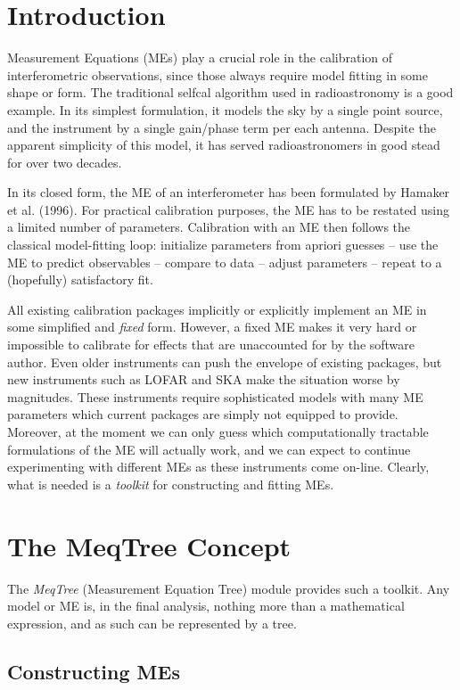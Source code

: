 \documentclass[11pt,twoside]{article}  %
\begin{document}
\section{Introduction}

Measurement Equations (MEs) play a crucial role in the calibration of
interferometric observations, since those always require model fitting in some
shape or form. The traditional selfcal algorithm used in radioastronomy is a
good example. In its simplest formulation, it models the sky by a single point
source, and the instrument by a single gain/phase term per each antenna. Despite
the apparent simplicity of this model, it has served radioastronomers in good
stead for over two decades.

In its closed form, the ME of an interferometer has been formulated by Hamaker
et al. (1996). For practical calibration purposes, the ME has to be restated
using a limited number of parameters. Calibration with an ME then follows the
classical model-fitting loop: initialize parameters from apriori guesses -- use
the ME to predict observables -- compare to data -- adjust parameters -- repeat
to a (hopefully) satisfactory fit.

All existing calibration packages implicitly or explicitly implement an ME in
some simplified and {\em fixed} form. However, a fixed ME makes it very hard or
impossible to calibrate for effects that are unaccounted for by the software
author. Even older instruments can push the envelope of existing packages, but
new instruments such as LOFAR and SKA make the situation worse by magnitudes.
These instruments require sophisticated models with many ME parameters which
current packages are simply not equipped to provide. Moreover, at the moment we
can only guess which computationally tractable formulations of the ME will
actually work, and we can expect to continue experimenting with different MEs as
these instruments come on-line. Clearly, what is needed is a {\em toolkit} for
constructing and fitting MEs. 

\section{The MeqTree Concept}

The {\em MeqTree} (Measurement Equation Tree) module provides such a toolkit.
Any model or ME is, in the final analysis, nothing more than a mathematical
expression, and as such can be represented by a tree.

\subsection{Constructing MEs}
\end{document}

